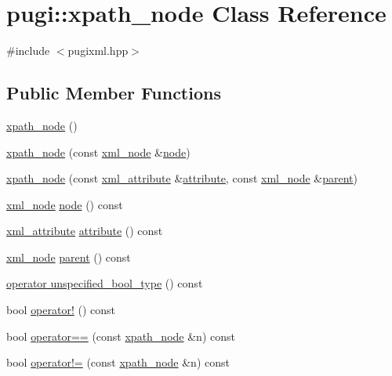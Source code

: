 \hypertarget{classpugi_1_1xpath__node}{\section{pugi\-:\-:xpath\-\_\-node Class Reference}
\label{classpugi_1_1xpath__node}
}


{\ttfamily \#include $<$pugixml.\-hpp$>$}

\subsection*{Public Member Functions}
\begin{DoxyCompactItemize}
\item 
\hyperlink{classpugi_1_1xpath__node_a149bbfe4c145f7ebb8852ae5136ede49}{xpath\-\_\-node} ()
\item 
\hyperlink{classpugi_1_1xpath__node_af35940ce58d68e3210c88c816396c158}{xpath\-\_\-node} (const \hyperlink{classpugi_1_1xml__node}{xml\-\_\-node} \&\hyperlink{classpugi_1_1xpath__node_a5b504b06678b84eedc8467cbd39beb8f}{node})
\item 
\hyperlink{classpugi_1_1xpath__node_a64e77111af6283205e83b97b76d953d0}{xpath\-\_\-node} (const \hyperlink{classpugi_1_1xml__attribute}{xml\-\_\-attribute} \&\hyperlink{classpugi_1_1xpath__node_ad3c5fe70e4293c70451abba5021a9406}{attribute}, const \hyperlink{classpugi_1_1xml__node}{xml\-\_\-node} \&\hyperlink{classpugi_1_1xpath__node_a69d8000479ceddd7c6939c7258f27c39}{parent})
\item 
\hyperlink{classpugi_1_1xml__node}{xml\-\_\-node} \hyperlink{classpugi_1_1xpath__node_a5b504b06678b84eedc8467cbd39beb8f}{node} () const 
\item 
\hyperlink{classpugi_1_1xml__attribute}{xml\-\_\-attribute} \hyperlink{classpugi_1_1xpath__node_ad3c5fe70e4293c70451abba5021a9406}{attribute} () const 
\item 
\hyperlink{classpugi_1_1xml__node}{xml\-\_\-node} \hyperlink{classpugi_1_1xpath__node_a69d8000479ceddd7c6939c7258f27c39}{parent} () const 
\item 
\hyperlink{classpugi_1_1xpath__node_a6e0b138075a145e47dc00a7a17b4ba81}{operator unspecified\-\_\-bool\-\_\-type} () const 
\item 
bool \hyperlink{classpugi_1_1xpath__node_a98167a5daf167fa06dff88b6c4af5646}{operator!} () const 
\item 
bool \hyperlink{classpugi_1_1xpath__node_ac41341c30e66880aad2a731203d9cf4b}{operator==} (const \hyperlink{classpugi_1_1xpath__node}{xpath\-\_\-node} \&n) const 
\item 
bool \hyperlink{classpugi_1_1xpath__node_a785725ca60a15a9d2df83b91725105bd}{operator!=} (const \hyperlink{classpugi_1_1xpath__node}{xpath\-\_\-node} \&n) const 
\end{DoxyCompactItemize}


